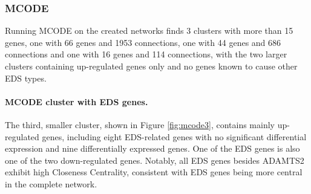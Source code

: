 %



\subsubsection{MCODE}
Running MCODE on the created networks finds 3 clusters with more than 15 genes, one with 66 genes and 1953 connections, one with 44 genes and 686 connections and one with 16 genes and 114 connections, with the two larger clusters containing up-regulated genes only and no genes known to cause other EDS types. %

\paragraph{MCODE cluster with EDS genes.}
The third, smaller cluster, shown in Figure \ref{fig:mcode3}, contains mainly up-regulated genes, including eight EDS-related genes with no significant differential expression and nine differentially expressed genes. One of the EDS genes is also one of the two down-regulated genes. Notably, all EDS genes besides ADAMTS2 exhibit high Closeness Centrality, consistent with EDS genes being more central in the complete network.

